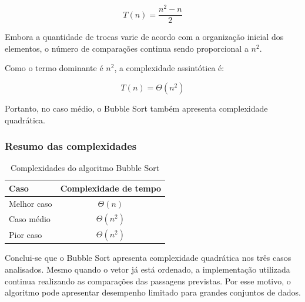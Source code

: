 \begin{equation}
T(n) = \frac{n^2-n}{2}
\end{equation}

Embora a quantidade de trocas varie de acordo com a organização inicial
dos elementos, o número de comparações continua sendo proporcional a
$n^2$.

Como o termo dominante é $n^2$, a complexidade assintótica é:

\begin{equation}
T(n) = \Theta(n^2)
\end{equation}

Portanto, no caso médio, o Bubble Sort também apresenta complexidade
quadrática.

\subsubsection{Resumo das complexidades}

\begin{table}[H]
    \centering
    \caption{Complexidades do algoritmo Bubble Sort}
    \label{tab:complexidade-bubble-analise}
    \begin{tabular}{lc}
        \hline
        \textbf{Caso} & \textbf{Complexidade de tempo} \\
        \hline
        Melhor caso & $\Theta(n)$ \\
        Caso médio & $\Theta(n^2)$ \\
        Pior caso & $\Theta(n^2)$ \\
        \hline
    \end{tabular}
\end{table}

Conclui-se que o Bubble Sort apresenta complexidade quadrática nos três
casos analisados. Mesmo quando o vetor já está ordenado, a implementação
utilizada continua realizando as comparações das passagens previstas.
Por esse motivo, o algoritmo pode apresentar desempenho limitado para
grandes conjuntos de dados.
